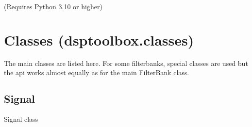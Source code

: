 \documentclass[letterpaper,10pt,english]{sphinxmanual}
\begin{document}
\begin{sphinxVerbatim}[commandchars=\\\{\}]
\end{sphinxVerbatim}

\sphinxAtStartPar
(Requires Python 3.10 or higher)

\sphinxstepscope


\chapter{Classes (dsptoolbox.classes)}
\label{\detokenize{classes:classes-dsptoolbox-classes}}\label{\detokenize{classes::doc}}
\sphinxAtStartPar
The main classes are listed here. For some filterbanks, special classes are used but the api works almost equally
as for the main FilterBank class.


\section{Signal}
\label{\detokenize{classes:module-dsptoolbox.classes.signal_class}}\label{\detokenize{classes:signal}}
\sphinxAtStartPar
Signal class
\end{document}

